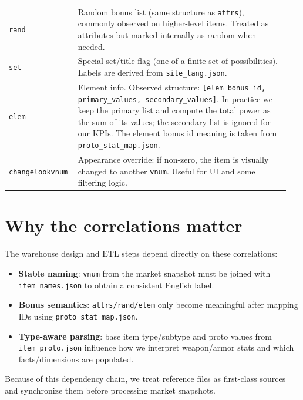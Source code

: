 \begin{longtable}{@{}p{0.22\linewidth}p{0.73\linewidth}@{}}
	\texttt{rand} & Random bonus list (same structure as \texttt{attrs}), commonly observed on higher-level items. Treated as attributes but marked internally as random when needed. \\

	\texttt{set} & Special set/title flag (one of a finite set of possibilities). Labels are derived from \texttt{site\_lang.json}. \\

	\texttt{elem} & Element info. Observed structure: \texttt{[elem\_bonus\_id, primary\_values, secondary\_values]}. In practice we keep the primary list and compute the total power as the sum of its values; the secondary list is ignored for our KPIs. The element bonus id meaning is taken from \texttt{proto\_stat\_map.json}. \\

	\texttt{changelookvnum} & Appearance override: if non-zero, the item is visually changed to another \texttt{vnum}. Useful for UI and some filtering logic. \\

\end{longtable}

\section{Why the correlations matter}
The warehouse design and ETL steps depend directly on these correlations:
\begin{itemize}
  \item \textbf{Stable naming}: \texttt{vnum} from the market snapshot must be joined with \texttt{item\_names.json} to obtain a consistent English label.
  \item \textbf{Bonus semantics}: \texttt{attrs/rand/elem} only become meaningful after mapping IDs using \texttt{proto\_stat\_map.json}.
  \item \textbf{Type-aware parsing}: base item type/subtype and proto values from \texttt{item\_proto.json} influence how we interpret weapon/armor stats and which facts/dimensions are populated.
\end{itemize}
Because of this dependency chain, we treat reference files as first-class sources and synchronize them before processing market snapshots.

